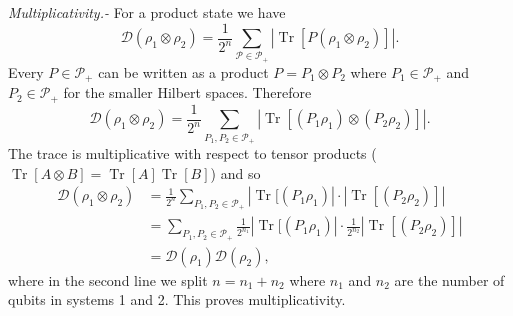 \documentclass[aps,prl,twocolumn,showpacs,superscriptaddress,groupedaddress,amsmath,amssymb]{revtex4-1}  %
\DeclareMathOperator{\Tr}{Tr}
\newcommand{\Pplus}{\ensuremath{\mathcal{P}_{+}}}
\newcommand{\tr}{\ensuremath{\mathrm{\Tr}}}
\begin{document}
\noindent\textit{Multiplicativity.-} For a product state we have
\begin{equation}
	\mathcal{D}(\rho_1 \otimes \rho_2 ) =\frac{1}{2^n} \sum_{\mathcal{P \in \Pplus }} | \tr[ P (\rho_1 \otimes \rho_2) ] |	.
\end{equation}
Every $P \in \Pplus$ can be written as a product $P = P_1 \otimes P_2$ where $P_1 \in \Pplus$ and $P_2 \in \Pplus$ for the smaller Hilbert spaces. Therefore
\begin{equation}
	\mathcal{D}(\rho_1 \otimes \rho_2 ) = \frac{1}{2^n}  \sum_{P_1, P_2 \in \Pplus }  | \tr[ (P_1 \rho_1) \otimes ( P_2 \rho_2) ] |	.
\end{equation}
The trace is multiplicative with respect to tensor products ($\tr[A\otimes B] =\tr[A] \tr [B]$) and so
\begin{align}
	\mathcal{D}(\rho_1 \otimes \rho_2 ) & = \frac{1}{2^n}  \sum_{P_1, P_2 \in \Pplus } | \tr[ (P_1 \rho_1) |    \cdot | \tr[  ( P_2 \rho_2) ] |	\\ \nonumber
& =   \sum_{P_1, P_2 \in \Pplus } \frac{1}{2^{n_1}} | \tr[ (P_1 \rho_1) |    \cdot  \frac{1}{2^{n_2}}| \tr[  ( P_2 \rho_2) ] |	\\ \nonumber
 & = \mathcal{D}(\rho_1) \mathcal{D}(\rho_2),
\end{align}
where in the second line we split $n=n_1 +n_2$ where $n_1$ and $n_2$ are the number of qubits in systems 1 and 2.  This proves multiplicativity.
\end{document}
